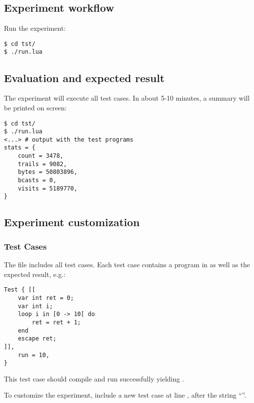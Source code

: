 {%
\subsection{Experiment workflow}

Run the experiment:

\begin{verbatim}
$ cd tst/
$ ./run.lua
\end{verbatim}

\subsection{Evaluation and expected result}

The experiment will execute all test cases.
In about 5-10 minutes, a summary will be printed on screen:

\begin{verbatim}
$ cd tst/
$ ./run.lua
<...> # output with the test programs
stats = {
    count = 3478,
    trails = 9082,
    bytes = 50803896,
    bcasts = 0,
    visits = 5189770,
}
\end{verbatim}

\subsection{Experiment customization}

\subsubsection{Test Cases}

The file  includes all test cases.
Each test case contains a program in \CEU as well as the expected result, e.g.:

\begin{verbatim}
Test { [[
    var int ret = 0;
    var int i;
    loop i in [0 -> 10[ do
        ret = ret + 1;
    end
    escape ret;
]],
    run = 10,
}
\end{verbatim}

This test case should compile and run successfully yielding .

To customize the experiment, include a new test case at line , after
the string ``''.

}
